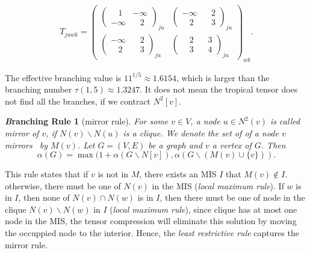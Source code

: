 \documentclass{article}
\newcommand{\<}{\langle}
\renewcommand{\>}{\rangle}
\renewcommand{\cite}[1]{{\citep{#1}}}
\newtheorem{corollary}{\textit Branching Rule}
\theoremstyle{definition}\newtheorem{definition}{\textit{Definition}}
\begin{document}
\begin{align}
    T_{juwk} = \left(\begin{matrix}
        \left(\begin{matrix}
        ~~~~1 & -\infty \\
        -\infty & ~~~~2
        \end{matrix}\right)_{ju}&
        \left(\begin{matrix}
        -\infty & ~~~~2 \\
        ~~~~2 & ~~~~3
        \end{matrix}\right)_{ju}\\
        \left(\begin{matrix}
        -\infty & ~~~~2 \\
        ~~~~2 & ~~~~3
        \end{matrix}\right)_{ju} &
        \left(\begin{matrix}
        ~~~~2 & ~~~~3 \\
        ~~~~3 & ~~~~4
        \end{matrix}\right)_{ju}
    \end{matrix}\right)_{wk}.
\end{align}

The effective branching value is $11^{1/5} \approx 1.6154$, which is larger than the branching number $\tau(1, 5) \approx 1.3247$.
It does not mean the tropical tensor does not find all the branches, if we contract $N^2[v]$.

\begin{corollary}[mirror rule] %
For some $v \in V$, a node $u \in N^2(v)$ is called mirror of $v$, if $N(v) \backslash N(u)$ is a clique. We denote the set of of a node $v$ mirrors~\cite{Fomin2013} by $M(v)$.
Let $G = (V, E)$ be a graph and $v$ a vertex of $G$. Then
\begin{equation}
\alpha(G) = \max(1 + \alpha(G \backslash N[v]), \alpha(G \backslash (M(v) \cup \{v\})).
\end{equation}
\end{corollary}

This rule states that if $v$ is not in $M$, there exists an MIS $I$ that $M(v)\notin I$.
otherwise, there must be one of $N(v)$ in the MIS (\textit{local maximum rule}).
If $w$ is in $I$, then none of $N(v) \cap N(w)$ is in $I$, then there must be one of node in the clique $N(v)\backslash N(w)$ in $I$ (\textit{local maximum rule}),
since clique has at most one node in the MIS, the tensor compression will eliminate this solution by moving the occuppied node to the interior.
Hence, the \textit{least restrictive rule} captures the mirror rule.
\end{document}
